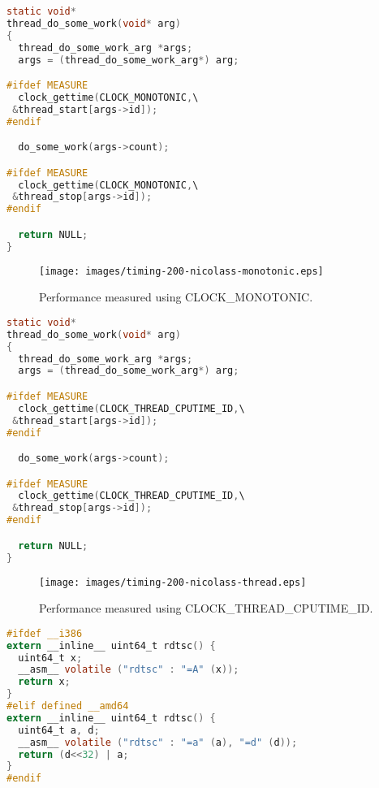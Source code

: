 \begin{lstlisting}[caption={Code using CLOCK\_MONOTONIC to monitor time.},label={lst:monotonic},language=C]
static void*
thread_do_some_work(void* arg)
{
  thread_do_some_work_arg *args;
  args = (thread_do_some_work_arg*) arg;

#ifdef MEASURE
  clock_gettime(CLOCK_MONOTONIC,\
 &thread_start[args->id]);
#endif

  do_some_work(args->count);

#ifdef MEASURE
  clock_gettime(CLOCK_MONOTONIC,\
 &thread_stop[args->id]);
#endif

  return NULL;
}
\end{lstlisting}

\begin{figure}
\centering
\texttt{[image: images/timing-200-nicolass-monotonic.eps]}
\caption{Performance measured using CLOCK\_MONOTONIC.}
\label{fig:monotonic}
\end{figure}

\begin{lstlisting}[caption={Code using CLOCK\_THREAD\_CPUTIME\_ID to monitor time.},label={lst:thread},language=C]
static void*
thread_do_some_work(void* arg)
{
  thread_do_some_work_arg *args;
  args = (thread_do_some_work_arg*) arg;

#ifdef MEASURE
  clock_gettime(CLOCK_THREAD_CPUTIME_ID,\
 &thread_start[args->id]);
#endif

  do_some_work(args->count);

#ifdef MEASURE
  clock_gettime(CLOCK_THREAD_CPUTIME_ID,\
 &thread_stop[args->id]);
#endif

  return NULL;
}
\end{lstlisting}

\begin{figure}
\centering
\texttt{[image: images/timing-200-nicolass-thread.eps]}
\caption{Performance measured using CLOCK\_THREAD\_CPUTIME\_ID.}
\label{fig:thread}
\end{figure}

\begin{lstlisting}[caption={C inline assembly implementation of rdtsc using hardware registers.},label={lst:rdtsc},language=C]
#ifdef __i386
extern __inline__ uint64_t rdtsc() {
  uint64_t x;
  __asm__ volatile ("rdtsc" : "=A" (x));
  return x;
}
#elif defined __amd64
extern __inline__ uint64_t rdtsc() {
  uint64_t a, d;
  __asm__ volatile ("rdtsc" : "=a" (a), "=d" (d));
  return (d<<32) | a;
}
#endif
\end{lstlisting}

